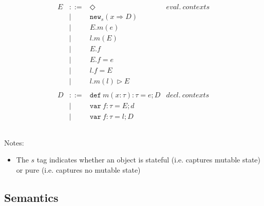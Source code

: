 \documentclass{llncs}
\newcommand{\keywadj}[1]{\mathtt{#1}}
\newcommand{\keyw}[1]{\keywadj{#1}~}
\begin{document}
\[\begin{array}{lll}
\begin{array}{lllr}
&&\\
E & ::= & \Diamond & eval.~ contexts\\
  & |   & \keywadj{new}_{s}(x \Rightarrow D) \\
  & |   & E.m(e)\\
  & |   & l.m(E)\\
  & |   & E.f \\
  & |   & E.f = e \\
  & |   & l.f = E \\
  & |   & l.m(l) \rhd E \\
&&\\
D & ::= & \keyw{def} m(x:\tau):\tau = e; D & decl.~ contexts\\
  & |   & \keyw{var} f:\tau = E; d \\
  & |   & \keyw{var} f:\tau = l; D \\
&&\\
\end{array}
\end{array}
\]

Notes:

\begin{itemize}
\item The $s$ tag indicates whether an object is stateful (i.e. captures mutable state) or pure (i.e. captures no mutable state)
\end{itemize}


\newpage

\subsection{Semantics}
\end{document}
